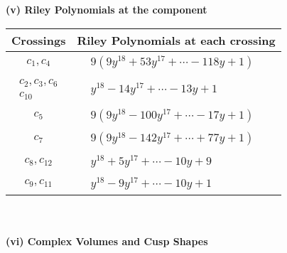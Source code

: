 \documentclass[1p]{elsarticle_modified}
\theoremstyle{definition}
\begin{document}
\newpage\renewcommand{\arraystretch}{1}
\flushleft \textbf{(v) Riley Polynomials at the component}\newline \\
\begin{tabular}{m{50pt}|m{274pt}}
Crossings & \hspace{64pt}Riley Polynomials at each crossing \\
\hline $$\begin{aligned}c_{1},c_{4}\end{aligned}$$&$\begin{aligned}
&9(9 y^{18}+53 y^{17}+\cdots-118 y+1)
\end{aligned}$\\
\hline $$\begin{aligned}c_{2},c_{3},c_{6}\\c_{10}\end{aligned}$$&$\begin{aligned}
&y^{18}-14 y^{17}+\cdots-13 y+1
\end{aligned}$\\
\hline $$\begin{aligned}c_{5}\end{aligned}$$&$\begin{aligned}
&9(9 y^{18}-100 y^{17}+\cdots-17 y+1)
\end{aligned}$\\
\hline $$\begin{aligned}c_{7}\end{aligned}$$&$\begin{aligned}
&9(9 y^{18}-142 y^{17}+\cdots+77 y+1)
\end{aligned}$\\
\hline $$\begin{aligned}c_{8},c_{12}\end{aligned}$$&$\begin{aligned}
&y^{18}+5 y^{17}+\cdots-10 y+9
\end{aligned}$\\
\hline $$\begin{aligned}c_{9},c_{11}\end{aligned}$$&$\begin{aligned}
&y^{18}-9 y^{17}+\cdots-10 y+1
\end{aligned}$\\
\hline
\end{tabular}\\~\\
\newpage\flushleft \textbf{(vi) Complex Volumes and Cusp Shapes}
\end{document}
